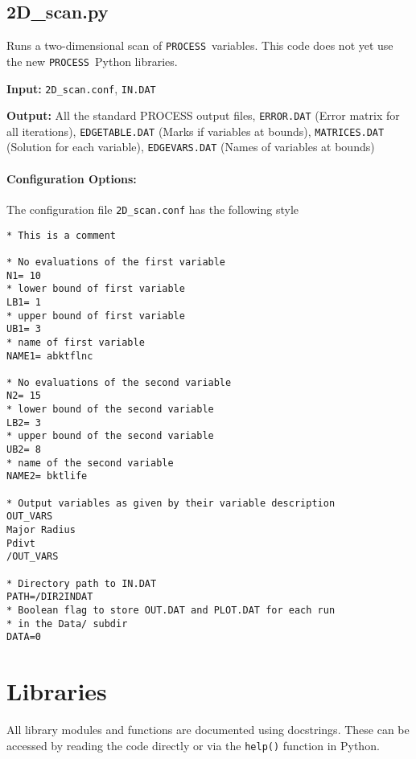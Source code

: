\documentclass[11pt,a4paper]{report}
\newcommand{\indat}{\mbox{\texttt{IN.DAT}}}
\newcommand{\process}{\mbox{\texttt{PROCESS}}}
\begin{document}
\subsection{2D\_scan.py}

Runs a two-dimensional scan of \process\ variables. This code does not yet use
the new \process\ Python libraries.

\begin{description}
\item{\textbf{Input:}}
 \texttt{2D\_scan.conf}, \indat\
                                
\item{\textbf{Output:}} All the standard PROCESS output files,
  \texttt{ERROR.DAT} (Error matrix for all iterations), \texttt{EDGETABLE.DAT}
  (Marks if variables at bounds), \texttt{MATRICES.DAT} (Solution for each
  variable), \texttt{EDGEVARS.DAT} (Names of variables at bounds)
\end{description}

\paragraph{Configuration Options:}

The configuration file \texttt{2D\_scan.conf} has the following style
\begin{framed}
\begin{verbatim}
* This is a comment

* No evaluations of the first variable
N1= 10
* lower bound of first variable
LB1= 1
* upper bound of first variable
UB1= 3
* name of first variable
NAME1= abktflnc

* No evaluations of the second variable
N2= 15
* lower bound of the second variable
LB2= 3
* upper bound of the second variable
UB2= 8
* name of the second variable
NAME2= bktlife

* Output variables as given by their variable description
OUT_VARS
Major Radius
Pdivt
/OUT_VARS

* Directory path to IN.DAT
PATH=/DIR2INDAT
* Boolean flag to store OUT.DAT and PLOT.DAT for each run
* in the Data/ subdir
DATA=0
\end{verbatim}
\end{framed}

\section{Libraries}
\label{sec:py_lib}

All library modules and functions are documented using docstrings. These can
be accessed by reading the code directly or via the \texttt{help()} function
in Python.
\end{document}
